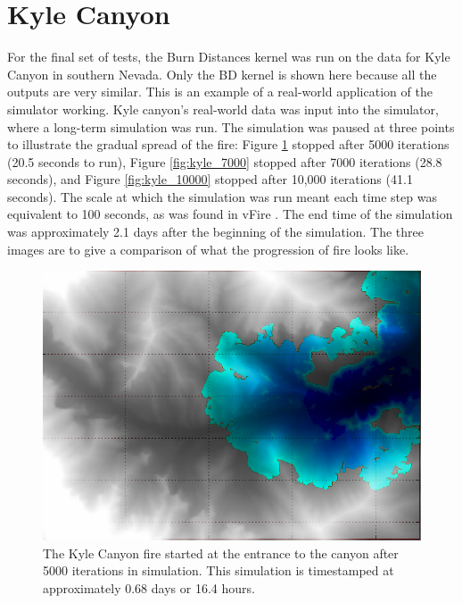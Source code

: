 \section{Kyle Canyon}
For the final set of tests, the Burn Distances kernel was run on the data for Kyle Canyon in southern Nevada. Only the BD kernel is shown here because all the outputs are very similar. This is an example of a real-world application of the simulator working. Kyle canyon's real-world data was input into the simulator, where a long-term simulation was run. The simulation was paused at three points to illustrate the gradual spread of the fire: Figure \ref{fig:kyle_5000} stopped after 5000 iterations (20.5 seconds to run), Figure \ref{fig:kyle_7000} stopped after 7000 iterations (28.8 seconds), and Figure \ref{fig:kyle_10000} stopped after 10,000 iterations (41.1 seconds). The scale at which the simulation was run meant each time step was equivalent to 100 seconds, as was found in vFire \cite{vFire}. The end time of the simulation was approximately 2.1 days after the beginning of the simulation. The three images are to give a comparison of what the progression of fire looks like. 
\begin{figure}[!b]
\centering
  \includegraphics[height=.4\textheight]{figures/results/overlay_5.png}
  \caption{The Kyle Canyon fire started at the entrance to the canyon after 5000 iterations in simulation. This simulation is timestamped at approximately 0.68 days or 16.4 hours.}
  \label{fig:kyle_5000}
\end{figure}  
